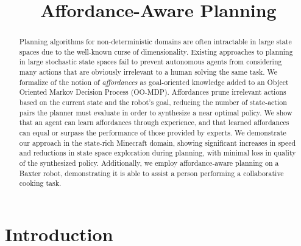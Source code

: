 \documentclass[letterpaper]{article}
\begin{document}
\title{Affordance-Aware Planning}


\maketitle

\begin{abstract}
Planning algorithms for non-deterministic domains are often
intractable in large state spaces due to the well-known curse of
dimensionality. Existing approaches to planning in large stochastic
state spaces fail to prevent autonomous agents from considering many
actions that are obviously irrelevant to a human solving the same
task. We formalize of the notion of {\em affordances} as
goal-oriented knowledge added to an Object Oriented Markov Decision
Process (OO-MDP).  Affordances prune irrelevant actions based on the current
state and the robot's goal, reducing the number of state-action pairs
the planner must evaluate in order to synthesize a near optimal
policy. We show that an agent can learn affordances through
experience, and that learned affordances can equal or surpass the
performance of those provided by experts.
We demonstrate our approach in the state-rich Minecraft domain, showing significant increases in
speed and reductions in state space exploration during planning, with
minimal loss in quality of the synthesized policy.  Additionally, we
employ affordance-aware planning on a Baxter robot, demonstrating it
is able to assist a person performing a collaborative cooking task.
\end{abstract}


\section{Introduction}
\label{sec:introduction}
\end{document}
